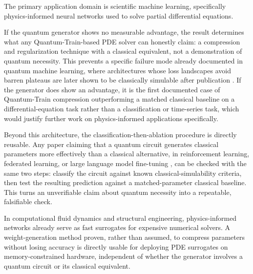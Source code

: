 \documentclass[10pt,a4paper]{article}
\begin{document}
The primary application domain is scientific machine learning, specifically physics-informed neural networks used to solve partial differential equations.

If the quantum generator shows no measurable advantage, the result determines what any Quantum-Train-based PDE solver can honestly claim: a compression and regularization technique with a classical equivalent, not a demonstration of quantum necessity. This prevents a specific failure mode already documented in quantum machine learning, where architectures whose loss landscapes avoid barren plateaus are later shown to be classically simulable after publication \cite{cerezo2025}. If the generator does show an advantage, it is the first documented case of Quantum-Train compression outperforming a matched classical baseline on a differential-equation task rather than a classification or time-series task, which would justify further work on physics-informed applications specifically.

Beyond this architecture, the classification-then-ablation procedure is directly reusable. Any paper claiming that a quantum circuit generates classical parameters more effectively than a classical alternative, in reinforcement learning, federated learning, or large language model fine-tuning \cite{liu2025typhoon}, can be checked with the same two steps: classify the circuit against known classical-simulability criteria, then test the resulting prediction against a matched-parameter classical baseline. This turns an unverifiable claim about quantum necessity into a repeatable, falsifiable check.

In computational fluid dynamics and structural engineering, physics-informed networks already serve as fast surrogates for expensive numerical solvers. A weight-generation method proven, rather than assumed, to compress parameters without losing accuracy is directly usable for deploying PDE surrogates on memory-constrained hardware, independent of whether the generator involves a quantum circuit or its classical equivalent.
\end{document}
